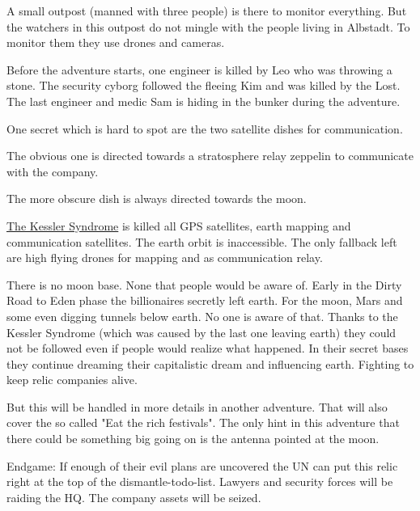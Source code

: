 A small outpost (manned with three people) is there to monitor everything. But the watchers in this outpost do not mingle with the people living in Albstadt. To monitor them they use drones and cameras.

Before the adventure starts, one engineer is killed by Leo who was throwing a stone. The security cyborg followed the fleeing Kim and was killed by the Lost.
The last engineer and medic Sam is hiding in the bunker during the adventure.

One secret which is hard to spot are the two satellite dishes for communication.

The obvious one is directed towards a stratosphere relay zeppelin to communicate with the company.

The more obscure dish is always directed towards the moon.

\begin{sidebarBox}[title=Kessler Syndrome]

    \hyperref[sec: Kessler Syndrome]{The Kessler Syndrome} is killed all GPS satellites, earth mapping and communication satellites. The earth orbit is inaccessible. The only fallback left are high flying drones for mapping and as communication relay.
\end{sidebarBox}


\begin{sidebarBox}[title=Moon base]

    There is no moon base. None that people would be aware of. Early in the Dirty Road to Eden phase the billionaires secretly left earth. For the moon, Mars and some even digging tunnels below earth. No one is aware of that. Thanks to the Kessler Syndrome (which was caused by the last one leaving earth) they could not be followed even if people would realize what happened.
    In their secret bases they continue dreaming their capitalistic dream and influencing earth. Fighting to keep relic companies alive.

    But this will be handled in more details in another adventure. That will also cover the so called "Eat the rich festivals". The only hint in this adventure that there could be something big going on is the antenna pointed at the moon.
\end{sidebarBox}

Endgame: If enough of their evil plans are uncovered the UN can put this relic right at the top of the dismantle-todo-list. Lawyers and security forces will be raiding the HQ. The company assets will be seized.


